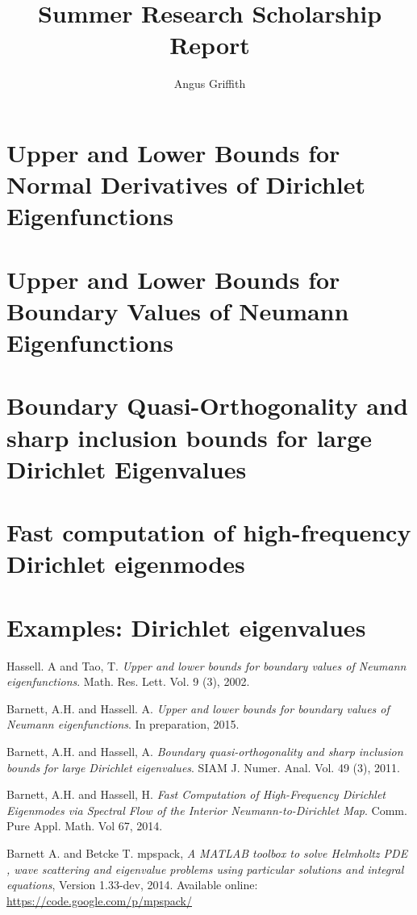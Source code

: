 \documentclass{article}
\author{Angus Griffith}
\title{Summer Research Scholarship Report}
\begin{document}
\section{Upper and Lower Bounds for Normal Derivatives of Dirichlet Eigenfunctions}
\cite{HT02}

\section{Upper and Lower Bounds for Boundary Values of Neumann Eigenfunctions}
\cite{BHXX}

\section{Boundary Quasi-Orthogonality and sharp inclusion bounds for large Dirichlet Eigenvalues}
\cite{BH11}

\section{Fast computation of high-frequency Dirichlet eigenmodes}
\cite{BH14}

\section{Examples: Dirichlet eigenvalues}

\begin{thebibliography}{9}

Hassell. A and Tao, T.
\textsl{Upper and lower bounds for boundary values of Neumann eigenfunctions}.
Math. Res. Lett. Vol. 9 (3), 2002. %

Barnett, A.H. and Hassell. A.
\textsl{Upper and lower bounds for boundary values of Neumann eigenfunctions}.
In preparation, 2015.

Barnett, A.H. and Hassell, A.
\textsl{Boundary quasi-orthogonality and sharp inclusion bounds for large Dirichlet eigenvalues}.
SIAM J. Numer. Anal. Vol. 49 (3), 2011.

Barnett, A.H. and Hassell, H.
\textsl{Fast Computation of High-Frequency Dirichlet Eigenmodes via Spectral Flow of the Interior Neumann-to-Dirichlet Map}.
Comm. Pure Appl. Math. Vol 67, 2014.

Barnett A. and Betcke T.
mpspack,
\textsl{A MATLAB toolbox to solve Helmholtz PDE , wave scattering and eigenvalue problems using particular solutions and integral equations},
Version 1.33-dev, 2014.
Available online: \url{https://code.google.com/p/mpspack/}

\end{thebibliography}
\end{document}
